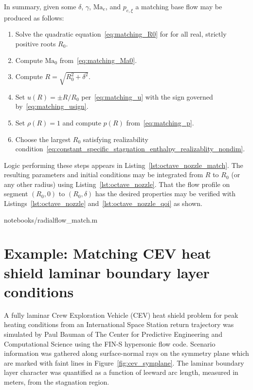 \documentclass[letterpaper,11pt,nointlimits,reqno]{amsart}
\newcommand{\Mach}[1][]{\mbox{Ma}_{#1}}
\begin{document}
In summary, given some $\delta$, $\gamma$, $\Mach[e]$, and $p_{e,\xi}$ a
matching base flow may be produced as follows:
\begin{enumerate}
    \item Solve the quadratic equation~\eqref{eq:matching_R0} for
          for all real, strictly positive roots $R_0$.
    \item Compute $\Mach[0]{}$ from~\eqref{eq:matching_Ma0}.
    \item Compute $R = \sqrt{R_0^2 + \delta^2}$.
    \item Set $u\!\left(R\right)=\pm R / R_0$ per~\eqref{eq:matching_u}
          with the sign governed by~\eqref{eq:matching_usign}.
    \item Set $\rho\!\left(R\right) = 1$ and compute $p\!\left(R\right)$
          from~\eqref{eq:matching_p}.
    \item Choose the largest $R_0$ satisfying realizability
          condition~\eqref{eq:constant_specific_stagnation_enthalpy_realizablity_nondim}.
\end{enumerate}
Logic performing these steps appears in Listing~\ref{lst:octave_nozzle_match}.
The resulting parameters and initial conditions may be integrated from $R$ to
$R_0$ (or any other radius) using Listing~\ref{lst:octave_nozzle}. That the flow
profile on segment $\left( R_0, 0 \right)$ to $\left( R_0, \delta \right)$ has
the desired properties may be verified with Listings~\ref{lst:octave_nozzle}
and~\ref{lst:octave_nozzle_qoi} as shown.


                {notebooks/radialflow_match.m}

\section{Example: Matching CEV heat shield laminar boundary layer conditions}

A fully laminar Crew Exploration Vehicle (CEV) heat shield problem for peak
heating conditions from an International Space Station return trajectory was
simulated by Paul Bauman of The Center for Predictive Engineering and
Computational Science using the FIN-S hypersonic flow
code\citep{KirkModeling2013}.  Scenario information was gathered along
surface-normal rays on the symmetry plane which are marked with faint lines in
Figure~\ref{fig:cev_symplane}.  The laminar boundary layer character was
quantified as a function of leeward arc length, measured in meters, from the
stagnation region.
\end{document}
